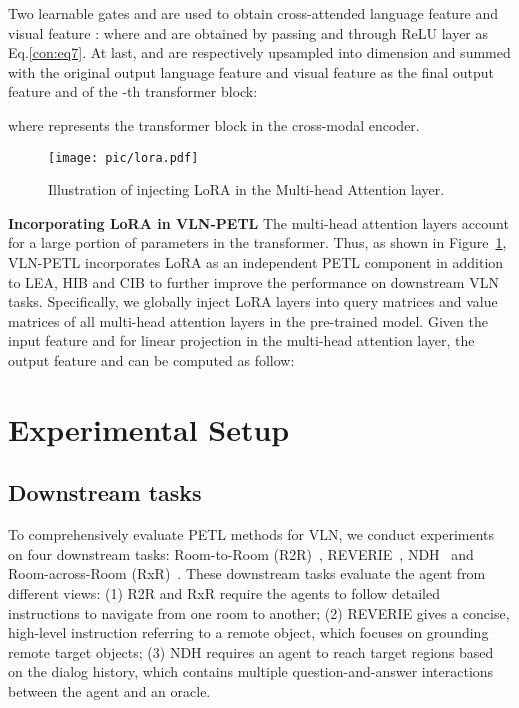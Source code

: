 \documentclass[10pt,twocolumn,letterpaper]{article}
\begin{document}
Two learnable gates  and  are used to obtain cross-attended language feature  and visual feature : 
where  and  are obtained by passing  and  through ReLU layer as Eq.\ref{con:eq7}. 
At last,  and  are respectively upsampled into  dimension and summed with the original output language feature  and visual feature  as the final output feature  and  of the -th transformer block:

where  represents the transformer block in the cross-modal encoder.

\begin{figure}[!t]
	\begin{center}
		\texttt{[image: pic/lora.pdf]}
	\end{center}
	\vspace{-18pt}
	\caption{Illustration of injecting LoRA in the Multi-head Attention layer.}
	\label{fig:lora}
	\vspace{-16pt}
\end{figure}

\noindent\textbf{Incorporating LoRA in VLN-PETL}
The multi-head attention layers account for a large portion of parameters in the transformer. 
Thus, 
as shown in Figure~\ref{fig:lora}, VLN-PETL incorporates LoRA as an independent PETL component in addition to LEA, HIB and CIB to further improve the performance on downstream VLN tasks. Specifically, we globally inject LoRA layers into query matrices  and value matrices  of all multi-head attention layers  
in the pre-trained model. Given the input feature  and  for linear projection in the multi-head attention layer, the output feature  and  can be computed as follow:

 \section{Experimental Setup}
\label{sec:experiment}


\subsection{Downstream tasks}
To comprehensively evaluate PETL methods for VLN, we conduct experiments on four downstream tasks: Room-to-Room (R2R)~\cite{r2r}, REVERIE~\cite{reverie}, NDH~\cite{ndh} and Room-across-Room (RxR)~\cite{rxr}. These downstream tasks evaluate the agent from different views: (1) R2R and RxR require the agents to follow detailed instructions to navigate from one room to another; (2) REVERIE gives a concise, high-level instruction referring to a remote object, which focuses on grounding remote target objects; (3) NDH requires an agent to reach target regions based on the dialog history, which contains multiple question-and-answer interactions between the agent and an oracle. 
\end{document}
